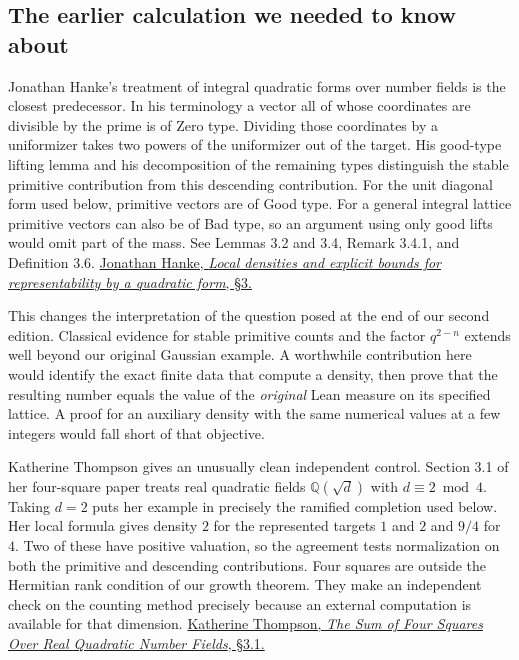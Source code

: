 \documentclass[12pt,letterpaper]{article}
\begin{document}
\subsection{The earlier calculation we needed to know about}
Jonathan Hanke's treatment of integral quadratic forms over number fields is the closest predecessor. In his terminology a vector all of whose coordinates are divisible by the prime is of Zero type. Dividing those coordinates by a uniformizer takes two powers of the uniformizer out of the target. His good-type lifting lemma and his decomposition of the remaining types distinguish the stable primitive contribution from this descending contribution. For the unit diagonal form used below, primitive vectors are of Good type. For a general integral lattice primitive vectors can also be of Bad type, so an argument using only good lifts would omit part of the mass. See Lemmas 3.2 and 3.4, Remark 3.4.1, and Definition 3.6.
\href{https://www.jonhanke.com/Hanke--all_papers__as_of_2015-01-14/explicit-bounds-paper.pdf}{Jonathan Hanke, \emph{Local densities and explicit bounds for representability by a quadratic form}, \S3.}

This changes the interpretation of the question posed at the end of our second edition. Classical evidence for stable primitive counts and the factor $q^{2-n}$ extends well beyond our original Gaussian example. A worthwhile contribution here would identify the exact finite data that compute a density, then prove that the resulting number equals the value of the \emph{original} Lean measure on its specified lattice. A proof for an auxiliary density with the same numerical values at a few integers would fall short of that objective.

Katherine Thompson gives an unusually clean independent control. Section 3.1 of her four-square paper treats real quadratic fields $\mathbb Q(\sqrt d)$ with $d\equiv2\bmod4$. Taking $d=2$ puts her example in precisely the ramified completion used below. Her local formula gives density $2$ for the represented targets $1$ and $2$ and $9/4$ for $4$. Two of these have positive valuation, so the agreement tests normalization on both the primitive and descending contributions. Four squares are outside the Hermitian rank condition of our growth theorem. They make an independent check on the counting method precisely because an external computation is available for that dimension.
\href{https://arxiv.org/pdf/1610.06935#page=6}{Katherine Thompson, \emph{The Sum of Four Squares Over Real Quadratic Number Fields}, \S3.1.}
\end{document}
